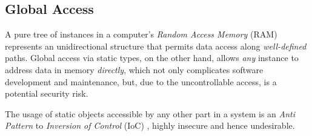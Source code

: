 %
%
%
%
%
%
%

\subsection{Global Access}
\label{global_access_heading}

A pure tree of instances in a computer's \emph{Random Access Memory} (RAM)
represents an unidirectional structure that permits data access along
\emph{well-defined} paths. Global access via static types, on the other hand,
allows \emph{any} instance to address data in memory \emph{directly}, which not
only complicates software development and maintenance, but, due to the
uncontrollable access, is a potential security risk.

The usage of static objects accessible by any other part in a system is an
\emph{Anti Pattern} to \emph{Inversion of Control} (IoC) \cite{avalon}, highly
insecure and hence undesirable.
